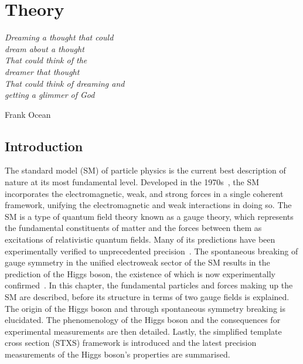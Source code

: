\chapter{Theory}
\label{chap:theory}

\epigraph{\textit{Dreaming a thought that could ~\\
                  dream about a thought ~\\
                  That could think of the ~\\
                  dreamer that thought ~\\
                  That could think of dreaming and ~\\
                  getting a glimmer of God}
                 }{Frank Ocean}

\section{Introduction}
The standard model (SM) of particle physics is the current best description of nature 
at its most fundamental level.
Developed in the 1970s~\cite{Glashow,Weinberg,Salam}, 
the SM incorporates the electromagnetic, weak, and strong forces in a single coherent framework, 
unifying the electromagnetic and weak interactions in doing so.
The SM is a type of quantum field theory known as a gauge theory, 
which represents the fundamental constituents of matter and the forces between them
as excitations of relativistic quantum fields.
Many of its predictions have been experimentally verified to unprecedented precision~\cite{EMstuff}.
The spontaneous breaking of gauge symmetry in the unified electroweak sector of the SM
results in the prediction of the Higgs boson, 
the existence of which is now experimentally confirmed~\cite{HiggsShit}.
In this chapter, the fundamental particles and forces making up the SM are described, 
before its structure in terms of two gauge fields is explained.
The origin of the Higgs boson and through spontaneous symmetry breaking is elucidated.
The phenomenology of the Higgs boson and the consequences for experimental measurements 
are then detailed. 
Lastly, the simplified template cross section (STXS) framework is introduced 
and the latest precision measurements of the Higgs boson's properties are summarised.

